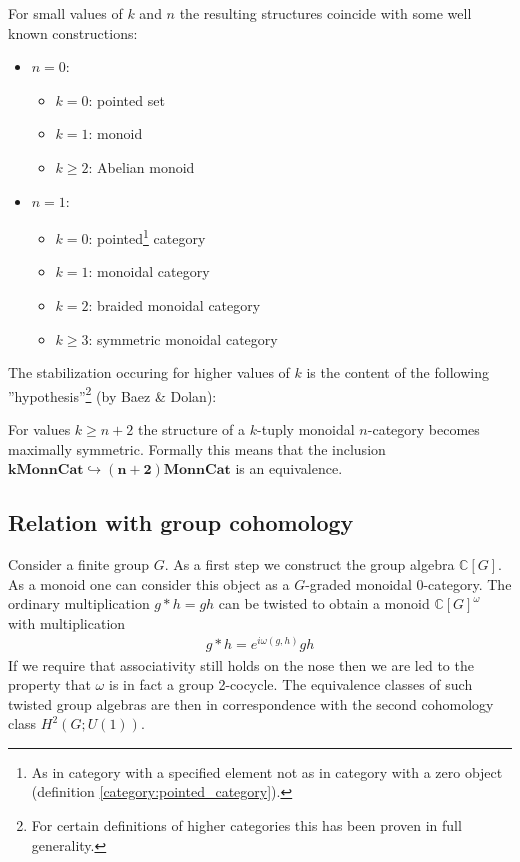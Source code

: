 	\begin{example}
		For small values of $k$ and $n$ the resulting structures coincide with some well known constructions:
		\begin{itemize}
			\item $n=0$:
				\begin{itemize}
					\item $k=0$: pointed set
					\item $k=1$: monoid
					\item $k\geq2$: Abelian monoid
				\end{itemize}
			\item $n=1$:
				\begin{itemize}
					\item $k=0$: pointed\footnote{As in category with a specified element not as in category with a zero object (definition \ref{category:pointed_category}).} category
					\item $k=1$: monoidal category
					\item $k=2$: braided monoidal category
					\item $k\geq3$: symmetric monoidal category
				\end{itemize}
		\end{itemize}
	\end{example}
	The stabilization occuring for higher values of $k$ is the content of the following ''hypothesis''\footnote{For certain definitions of higher categories this has been proven in full generality.} (by Baez \& Dolan):
	\begin{theorem}
		For values $k\geq n+2$ the structure of a $k$-tuply monoidal $n$-category becomes maximally symmetric. Formally this means that the inclusion \emph{$\boldsymbol{k}\textbf{Mon}\boldsymbol{n}\textbf{Cat}\hookrightarrow\boldsymbol{(n+2)}\textbf{Mon}\boldsymbol{n}\textbf{Cat}$} is an equivalence.
	\end{theorem}
	
\subsection[Relation with group cohomology]{Relation with group cohomology\footnotemark}

	Consider a finite group $G$. As a first step we construct the group algebra $\mathbb{C}[G]$. As a monoid one can consider this object as a $G$-graded monoidal 0-category. The ordinary multiplication $g\ast h=gh$ can be twisted to obtain a monoid $\mathbb{C}[G]^\omega$ with multiplication
	\begin{gather}
		g\ast h = e^{i\omega(g, h)}gh
	\end{gather}
	If we require that associativity still holds on the nose then we are led to the property that $\omega$ is in fact a group 2-cocycle. The equivalence classes of such twisted group algebras are then in correspondence with the second cohomology class $H^2(G; U(1))$.
	
